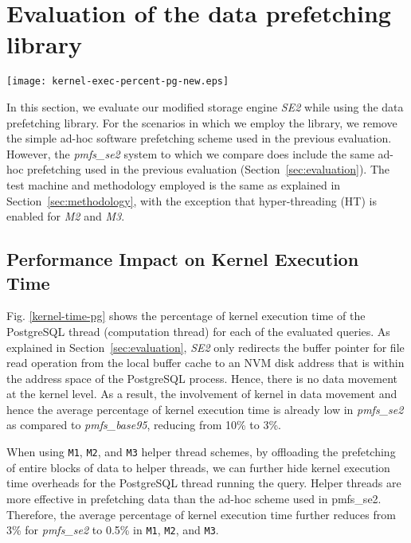 \section{Evaluation of the data prefetching library}
\label{sec:library-evalualtion}

\begin{figure*}
\centering
\texttt{[image: kernel-exec-percent-pg-new.eps]}
\caption{Percentage of kernel execution time for PostgreSQL thread}
\label{kernel-time-pg}
\end{figure*}

\noindent In this section, we evaluate our modified storage engine \emph{SE2} while using the data prefetching library. 
For the scenarios in which we employ the library, we remove the simple ad-hoc software prefetching scheme used in the previous evaluation. However, the \emph{pmfs\_se2} system to which we compare does include the same ad-hoc prefetching used in the previous evaluation (Section~\ref{sec:evaluation}). The test machine and methodology employed is the same as explained in Section~\ref{sec:methodology}, with the exception that hyper-threading (HT) is enabled for \emph{M2} and \emph{M3}.



\subsection{Performance Impact on Kernel Execution Time}

Fig. \ref{kernel-time-pg} shows the percentage of kernel execution time of the PostgreSQL thread (computation thread) for each of the evaluated queries. As explained in Section~\ref{sec:evaluation}, \emph{SE2} only redirects the buffer pointer for file read operation from the local buffer cache to an NVM disk address that is within the address space of the PostgreSQL process. Hence, there is no data movement at the kernel level. As a result, the involvement of kernel in data movement and hence the average percentage of kernel execution time is already low in \emph{pmfs\_se2} as compared to \emph{pmfs\_base95}, reducing from 10\% to 3\%.

When using \verb+M1+, \verb+M2+, and \verb+M3+ helper thread schemes, by offloading the prefetching of entire blocks of data to helper threads, we can further hide kernel execution time overheads for the PostgreSQL thread running the query. Helper threads are more effective in prefetching data than the ad-hoc scheme used in pmfs\_se2. Therefore, the average percentage of kernel execution time further reduces from 3\% for \emph{pmfs\_se2} to 0.5\% in \verb+M1+, \verb+M2+, and \verb+M3+.

